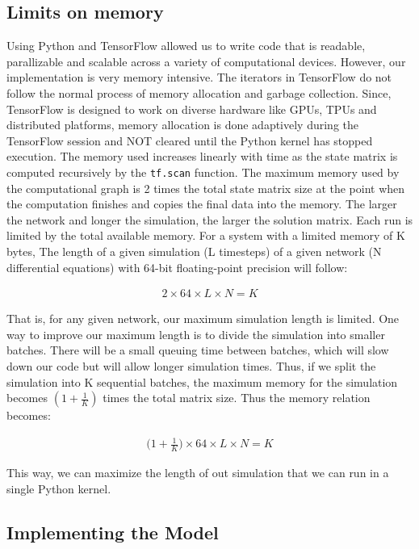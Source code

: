 \documentclass[10pt,letterpaper]{article}
\begin{document}
\begin{nolinenumbers}
\subsection*{Limits on memory}

Using Python and TensorFlow allowed us to write code that is readable, parallizable and scalable across a variety of computational devices. However, our implementation is very memory intensive. The iterators in TensorFlow do not follow the normal process of memory allocation and garbage collection. Since, TensorFlow is designed to work on diverse hardware like GPUs, TPUs and distributed platforms, memory allocation is done adaptively during the TensorFlow session and NOT cleared until the Python kernel has stopped execution. The memory used increases linearly with time as the state matrix is computed recursively by the \texttt{tf.scan} function. The maximum memory used by the computational graph is 2 times the total state matrix size at the point when the computation finishes and copies the final data into the memory. The larger the network and longer the simulation, the larger the solution matrix. Each run is limited by the total available memory. For a system with a limited memory of K bytes, The length of a given simulation (L timesteps) of a given network (N differential equations) with 64-bit floating-point precision will follow: 

\begin{eqnarray}2\times64\times L\times N=K\end{eqnarray}

That is, for any given network, our maximum simulation length is limited. One way to improve our maximum length is to divide the simulation into smaller batches. There will be a small queuing time between batches, which will slow down our code but will allow longer simulation times. Thus, if we split the simulation into K sequential batches, the maximum memory for the simulation becomes $(1+\frac{1}{K})$ times the total matrix size. Thus the memory relation becomes:  

\begin{eqnarray}\Big(1+\frac{1}{K}\Big)\times64\times L\times N=K\end{eqnarray}

This way, we can maximize the length of out simulation that we can run in a single Python kernel.

\subsection*{Implementing the Model}


\end{nolinenumbers}
\end{document}
